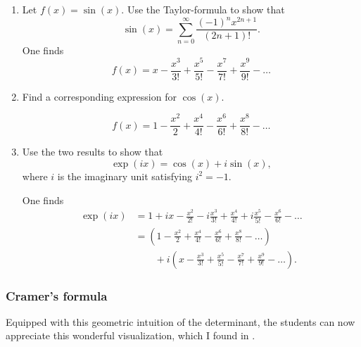\documentclass[graybox]{svmult}
\begin{document}
\begin{enumerate}
	\item Let $f(x)=\sin(x)$.  Use the Taylor-formula to show that
	\[
	\sin(x) = \sum_{n=0}^{\infty}  \frac{(-1)^n x^{2n+1}}{(2n+1)!}.
	\]
	One finds	
	\[
	f(x) = x -\frac{x^3}{3!} + \frac{x^5}{5!} - \frac{x^7}{7!} + \frac{x^9}{9!} - \ldots
	\]
	\item Find a corresponding expression for $\cos(x)$.
	
	\[
	f(x) = 1 - \frac{x^2}{2} +\frac{x^4}{4!} - \frac{x^6}{6!} + \frac{x^8}{8!} - \ldots
	\]
	
	\item Use the two results to show that 
	\[
	\exp(ix) = \cos(x) + i \sin(x),
 	\]
 	where $i$ is the imaginary unit satisfying $i^2=-1$.

	One finds	
	\begin{align*}
	\exp(ix) &= 1 +ix - \frac{x^2}{2!} - i\frac{x^3}{3!} + \frac{x^4}{4!} + i\frac{x^5}{5!} - \frac{x^6}{6!} - \ldots \\
	 &= \left( 1 - \frac{x^2}{2} +\frac{x^4}{4!} - \frac{x^6}{6!} + \frac{x^8}{8!} - \ldots \right) \\
	 & \qquad + i \left(  x -\frac{x^3}{3!} + \frac{x^5}{5!} - \frac{x^7}{7!} + \frac{x^9}{9!} - \ldots \right).
	\end{align*}
\end{enumerate}

\subsubsection{Cramer's formula}

Equipped with this geometric intuition of the determinant, the students can now appreciate this wonderful visualization, which I found in \cite{Nelsen2000}.
\end{document}
